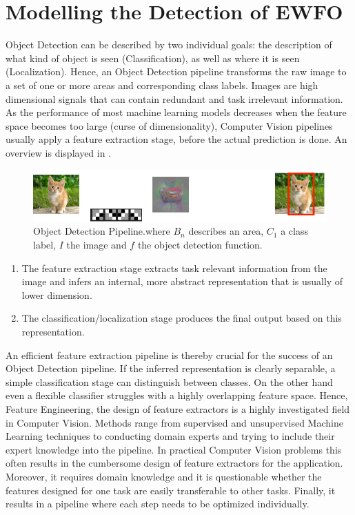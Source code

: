 	\chapter{Modelling the Detection of \ac{EWFO}}
	\label{sec:object_detection}
	
	Object Detection can be described by two individual goals: the description of what kind of object is seen (Classification), as well as where it is seen (Localization). Hence, an Object Detection pipeline transforms the raw image to a set of one or more areas and corresponding class labels. Images are high dimensional signals that can contain redundant and task irrelevant information. As the performance of most machine learning models decreases when the feature space becomes too large (curse of dimensionality), Computer Vision pipelines usually apply a feature extraction stage, before the actual prediction is done. An overview is displayed in .
	
	\begin{figure}[hbtp]
		
		\centering
		\includegraphics[width=\linewidth]{fig/ObjectDetection}
		\caption{Object Detection Pipeline.where $B_n$ describes an area, $C_1$ a class label, $I$ the image and $f$ the object detection function.}
		\label{fig:obj_pipeline}
	\end{figure}
	\begin{enumerate}
	\item The feature extraction stage extracts task relevant information from the image and infers an internal, more abstract representation that is usually of lower dimension.
	
	\item The classification/localization stage produces the final output based on this representation. 
	
	\end{enumerate}

	An efficient feature extraction pipeline is thereby crucial for the success of an Object Detection pipeline. If the inferred representation is clearly separable, a simple classification stage can distinguish between classes. On the other hand even a flexible classifier struggles with a highly overlapping feature space. Hence, Feature Engineering, the design of feature extractors is a highly investigated field in Computer Vision. Methods range from supervised and unsupervised Machine Learning techniques to conducting domain experts and trying to include their expert knowledge into the pipeline. In practical Computer Vision problems this often results in the cumbersome design of feature extractors for the application. Moreover, it requires domain knowledge and it is questionable whether the features designed for one task are easily transferable to other tasks. Finally, it results in a pipeline where each step needs to be optimized individually.
	
